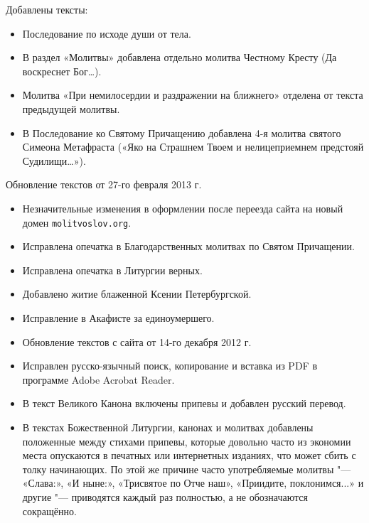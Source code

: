 {\begin{itemize}
\end{itemize}

Добавлены тексты:

\begin{itemize}

\item Последование по исходе души от тела.
\item В раздел «Молитвы» добавлена отдельно молитва Честному Кресту (Да воскреснет Бог\ldots).
\item Молитва «При немилосердии и раздражении на ближнего» отделена от текста предыдущей молитвы.
\item В Последование ко Святому Причащению добавлена 4-я молитва святого Симеона Метафраста («Яко на Страшнем Твоем и нелицеприемнем предстояй Судилищи\ldots»).

\end{itemize}


{\small Обновление текстов от 27-го февраля 2013 г.

\begin{itemize}

\item Незначительные изменения в оформлении после переезда сайта на новый домен \texttt{molitvoslov.org}.
\item Исправлена опечатка в Благодарственных молитвах по Святом Причащении.
\item Исправлена опечатка в Литургии верных.
\item Добавлено житие блаженной Ксении Петербургской.
\item Исправление в Акафисте за единоумершего.

\end{itemize}}


{\small\begin{itemize}

\item Обновление текстов с сайта от 14-го декабря 2012 г.
\item Исправлен русско-язычный поиск, копирование и вставка из PDF в программе Adobe Acrobat Reader.
\item В текст Великого Канона включены припевы и добавлен русский перевод.

\item В текстах Божественной Литургии, канонах и молитвах добавлены положенные между стихами припевы, которые довольно часто из экономии места опускаются в печатных или интернетных изданиях, что может сбить с толку начинающих. По этой же причине часто употребляемые молитвы "--- «Слава:», «И ныне:», «Трисвятое по Отче наш», «Приидите, поклонимся...» и другие "--- приводятся каждый раз полностью, а не обозначаются сокращённо.


\end{itemize}}}
